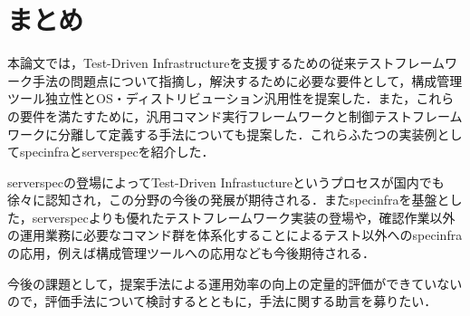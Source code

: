 \section{まとめ}

本論文では，Test-Driven Infrastructureを支援するための従来テストフレームワーク手法の問題点について指摘し，解決するために必要な要件として，構成管理ツール独立性とOS・ディストリビューション汎用性を提案した．また，これらの要件を満たすために，汎用コマンド実行フレームワークと制御テストフレームワークに分離して定義する手法についても提案した．これらふたつの実装例としてspecinfraとserverspecを紹介した．

serverspecの登場によってTest-Driven Infrastuctureというプロセスが国内でも徐々に認知され，この分野の今後の発展が期待される．またspecinfraを基盤とした，serverspecよりも優れたテストフレームワーク実装の登場や，確認作業以外の運用業務に必要なコマンド群を体系化することによるテスト以外へのspecinfraの応用，例えば構成管理ツールへの応用なども今後期待される．

今後の課題として，提案手法による運用効率の向上の定量的評価ができていないので，評価手法について検討するとともに，手法に関する助言を募りたい．


